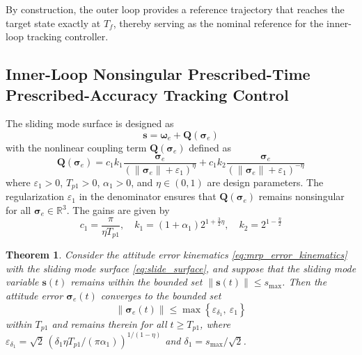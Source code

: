 \documentclass[journal]{new-aiaa}
\newtheorem{theorem}{Theorem}
\begin{document}
By construction, the outer loop provides a reference trajectory that reaches the target state exactly at $T_f$, thereby serving as the nominal reference for the inner-loop tracking controller.

\subsection{Inner-Loop Nonsingular Prescribed-Time Prescribed-Accuracy Tracking Control}
\label{sec:inner}

The sliding mode surface is designed as
\begin{equation}
\boldsymbol{s} = \boldsymbol{\omega}_e + \boldsymbol{Q}(\boldsymbol{\sigma}_e)
\label{eq:slide_surface}
\end{equation}
with the nonlinear coupling term $\boldsymbol{Q}(\boldsymbol{\sigma}_e)$ defined as
\begin{equation}
\boldsymbol{Q}(\boldsymbol{\sigma}_e) 
= c_1 k_1 \frac{\boldsymbol{\sigma}_e}{(\|\boldsymbol{\sigma}_e\| + \varepsilon_1)^\eta}
+ c_1 k_2 \frac{\boldsymbol{\sigma}_e}{(\|\boldsymbol{\sigma}_e\| + \varepsilon_1)^{-\eta}}
\end{equation}
where $\varepsilon_1 > 0$, $T_{p1} > 0$, $\alpha_1 > 0$, and $\eta\in(0,1)$ are design parameters. The regularization $\varepsilon_1$ in the denominator ensures that $\boldsymbol{Q}(\boldsymbol{\sigma}_e)$ remains nonsingular for all $\boldsymbol{\sigma}_e\in\mathbb{R}^3$. The gains are given by
\[
c_1 = \frac{\pi}{\eta T_{p1}}, \quad
k_1 = (1 + \alpha_1) 2^{1 + \frac{3}{2}\eta}, \quad
k_2 = 2^{1 - \frac{\eta}{2}}
\]

\begin{theorem}
\label{thm:attitude_convergence}
Consider the attitude error kinematics \eqref{eq:mrp_error_kinematics} with the sliding mode surface \eqref{eq:slide_surface}, 
and suppose that the sliding mode variable $\boldsymbol{s}(t)$ remains within the bounded set $\|\boldsymbol{s}(t)\| \le s_{\max}$. 
Then the attitude error $\boldsymbol{\sigma}_e(t)$ converges to the bounded set
\begin{equation}
\|\boldsymbol{\sigma}_e(t)\| \le \max\left\{ \varepsilon_{\delta_1},\ \varepsilon_1 \right\}
\end{equation}
within $T_{p1}$ and remains therein for all $t\ge T_{p1}$, where
$\varepsilon_{\delta_1} = \sqrt{2}\,( \delta_1 \eta T_{p1} / (\pi \alpha_1) )^{1/(1-\eta)}$
and $\delta_1 = s_{\max}/\sqrt{2}$.
\end{theorem}
\end{document}
